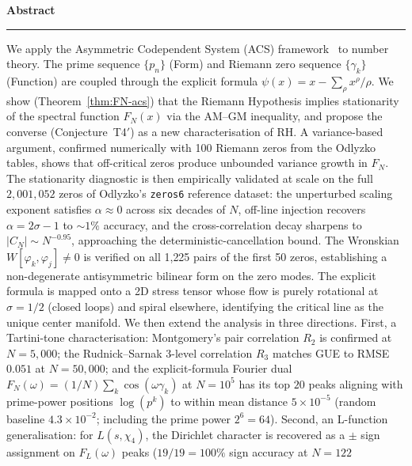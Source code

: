 \documentclass[11pt,a4paper]{article}
\theoremstyle{plain}
\theoremstyle{definition}
\theoremstyle{remark}
\begin{document}
\begin{titlepage}
\begin{center}
\begin{minipage}{0.88\textwidth}
\begin{center}
  {\bfseries\color{acsprimary}\large Abstract}\\[0.3em]
  {\color{acsrule}\rule{1.2in}{0.3pt}}
\end{center}
\vspace{0.5em}
\small\noindent
We apply the Asymmetric Codependent System (ACS) framework~\cite{Wallace2026a}
to number theory.  The prime sequence $\{p_n\}$ (Form) and Riemann zero
sequence $\{\gamma_k\}$ (Function) are coupled through the explicit formula
$\psi(x) = x - \sum_\rho x^\rho/\rho$.  We show (Theorem~\ref{thm:FN-acs})
that the Riemann Hypothesis implies stationarity of the spectral function
$F_N(x)$ via the AM--GM inequality, and propose the converse
(Conjecture~T4$'$) as a new characterisation of RH.  A variance-based
argument, confirmed numerically with 100 Riemann zeros from the Odlyzko
tables, shows that off-critical zeros produce unbounded variance growth
in $F_N$.  The stationarity diagnostic is then empirically validated
at scale on the full $2{,}001{,}052$ zeros of Odlyzko's \texttt{zeros6}
reference dataset: the unperturbed scaling exponent satisfies
$\alpha \approx 0$ across six decades of $N$, off-line injection
recovers $\alpha = 2\sigma - 1$ to $\sim 1\%$ accuracy, and the
cross-correlation decay sharpens to $|C_N| \sim N^{-0.95}$,
approaching the deterministic-cancellation bound.  The Wronskian
$W[\varphi_k,\varphi_j] \neq 0$ is verified on all 1{,}225 pairs of
the first 50 zeros, establishing a non-degenerate antisymmetric
bilinear form on the zero modes.  The explicit formula is mapped
onto a 2D stress tensor whose flow is purely rotational at
$\sigma = 1/2$ (closed loops) and spiral elsewhere, identifying the
critical line as the unique center manifold.  We then extend the analysis
in three directions.  First, a Tartini-tone characterisation:
Montgomery's pair correlation $R_2$ is confirmed at $N=5{,}000$;
the Rudnick--Sarnak 3-level correlation $R_3$ matches GUE to
RMSE $0.051$ at $N=50{,}000$; and the explicit-formula Fourier dual
$F_N(\omega) = (1/N)\sum_k\cos(\omega\gamma_k)$ at $N=10^5$ has its top
$20$ peaks aligning with prime-power positions $\log(p^k)$ to within
mean distance $5\times 10^{-5}$ (random baseline $4.3\times 10^{-2}$;
including the prime power $2^6=64$).  Second, an L-function generalisation:
for $L(s,\chi_4)$, the Dirichlet character is recovered as a $\pm$ sign
assignment on $F_L(\omega)$ peaks ($19/19=100\%$ sign accuracy at $N=122$

\end{minipage}
\end{center}
\end{titlepage}
\end{document}
